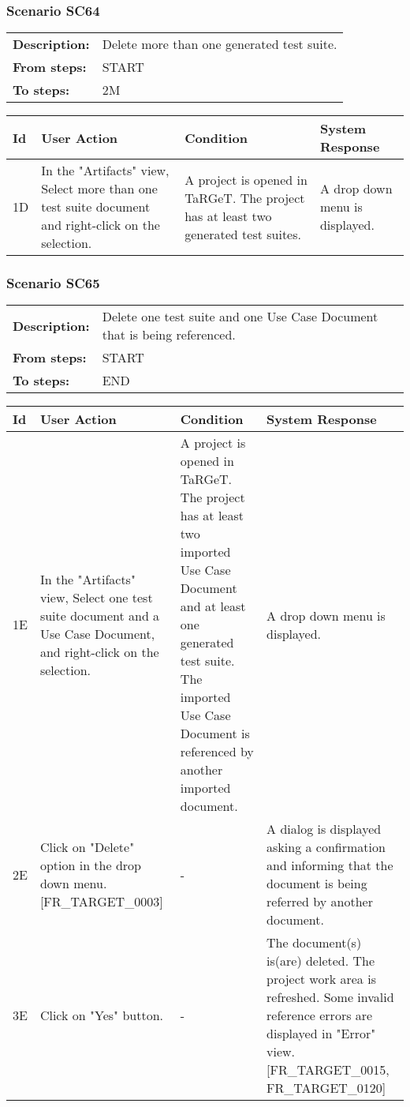 \documentclass[a4paper,11pt]{article}
\newcommand{\bl}{\\ \hline}
\begin{document}
\subsubsection*{Scenario SC64}
\begin{tabular}{p{1in}p{4in}}
{\bf Description:} & Delete more than one generated test suite.
				 \\
{\bf From steps:} & START \\
{\bf To steps:} & 2M \\
\end{tabular}
 
\begin{tabular}{|p{0.8in}|p{1.6in}|p{1.6in}|p{1.6in}|}
\hline
Id & User Action & Condition & System Response  \bl 
1D & In the "Artifacts" view, Select more than one test suite
						document and right-click on the selection.  & A project is opened in TaRGeT. The project has at least
						two generated test suites. & A drop down menu is displayed. \bl 
\end{tabular}
\subsubsection*{Scenario SC65}
\begin{tabular}{p{1in}p{4in}}
{\bf Description:} & Delete one test suite and one Use Case Document that is
					being referenced. \\
{\bf From steps:} & START \\
{\bf To steps:} & END \\
\end{tabular}
 
\begin{tabular}{|p{0.8in}|p{1.6in}|p{1.6in}|p{1.6in}|}
\hline
Id & User Action & Condition & System Response  \bl 
1E & In the "Artifacts" view, Select one test suite document and
						a Use Case Document, and right-click on the selection.  & A project is opened in TaRGeT. The project has at least
						two imported Use Case Document and at least one generated test
						suite. The imported Use Case Document is referenced by another
						imported document. & A drop down menu is displayed. \bl 
2E & Click on "Delete" option in the drop down menu.
						[FR_TARGET_0003] & - & A dialog is displayed asking a confirmation and informing
						that the document is being referred by another document.
					 \bl 
3E & Click on "Yes" button. & - & The document(s) is(are) deleted. The project work area is
						refreshed. Some invalid reference errors are displayed in "Error"
						view. [FR_TARGET_0015, FR_TARGET_0120] \bl 
\end{tabular}
\end{document}
